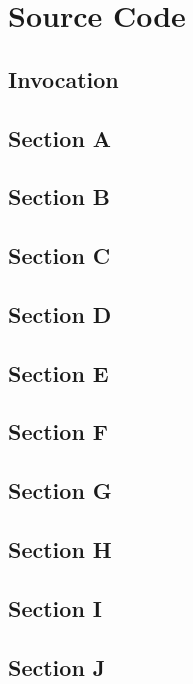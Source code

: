 \chapter{Source Code}

\section{Invocation}


\section{Section A}


\section{Section B}


\section{Section C}


\section{Section D}


\section{Section E}


\section{Section F}


\section{Section G}


\section{Section H}


\section{Section I}


\section{Section J}
